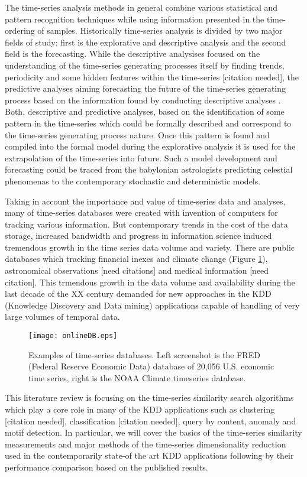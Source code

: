 The time-series analysis methods in general combine various statistical and pattern recognition techniques while using information presented in the time-ordering of samples. Historically time-series analysis is divided by two major fields of study: first is the explorative and descriptive analysis and the second field is the forecasting. 
While the descriptive analysises focused on the understanding of the time-series generating processes itself by finding trends, periodicity and some hidden features within the time-series [citation needed], the predictive analyses aiming forecasting the future of the time-series generating process based on the information found by conducting descriptive analyses \cite{citeulike:3449765}. 
Both, descriptive and predictive analyses, based on the identification of some pattern in the time-series which could be formally described and correspond to the time-series generating process nature. Once this pattern is found and compiled into the formal model during the explorative analysis it is used for the extrapolation of the time-series into future. Such a model development and forecasting could be traced from the babylonian astrologists predicting celestial phenomenas to the contemporary stochastic and deterministic models.

Taking in account the importance and value of time-series data and analyses, many of time-series databases were created with invention of computers for tracking various information. But contemporary trends in the cost of the data storage, increased bandwidth and progress in information science induced tremendous growth in the time series data volume and variety. There are public databases which tracking financial inexes and climate change (Figure \ref{fig:onlineDB}), astronomical observations [need citations] and medical information [need citation]. This trmendous growth in the data volume and availability during the last decade of the XX century demanded for new approaches in the KDD (Knowledge Discovery and Data mining) applications capable of handling of very large volumes of temporal data.
\begin{figure}[tbp]
   \centering
   \texttt{[image: onlineDB.eps]}
   \caption{Examples of time-series databases. Left screenshot is the FRED (Federal Reserve Economic Data) database of 20,056 U.S. economic time series, right is the NOAA Climate timeseries database.}
   \label{fig:onlineDB}
\end{figure} 
This literature review is focusing on the time-series similarity search algorithms which play a core role in many of the KDD applications such as clustering [citation needed], classification [citation needed], query by content, anomaly and motif detection. In particular, we will cover the basics of the time-series similarity measurements and major methods of the time-series dimensionality reduction used in the contemporarily state-of the art KDD applications following by their performance comparison based on the published results.